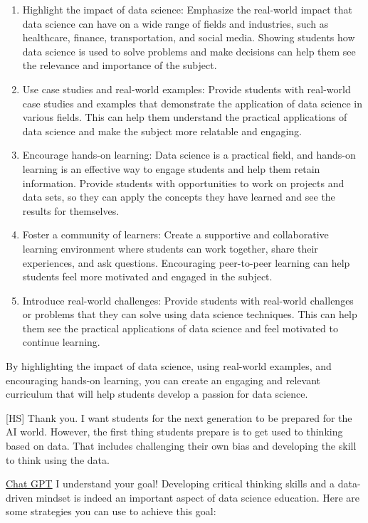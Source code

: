 \documentclass[
]{book}
\providecommand{\tightlist}{%
  \setlength{\itemsep}{0pt}\setlength{\parskip}{0pt}}
\theoremstyle{definition}
\theoremstyle{definition}
\theoremstyle{definition}
\theoremstyle{definition}
\theoremstyle{remark}
\begin{document}
\begin{enumerate}
\def\labelenumi{\arabic{enumi}.}
\tightlist
\item
  Highlight the impact of data science: Emphasize the real-world impact that data science can have on a wide range of fields and industries, such as healthcare, finance, transportation, and social media. Showing students how data science is used to solve problems and make decisions can help them see the relevance and importance of the subject.
\item
  Use case studies and real-world examples: Provide students with real-world case studies and examples that demonstrate the application of data science in various fields. This can help them understand the practical applications of data science and make the subject more relatable and engaging.
\item
  Encourage hands-on learning: Data science is a practical field, and hands-on learning is an effective way to engage students and help them retain information. Provide students with opportunities to work on projects and data sets, so they can apply the concepts they have learned and see the results for themselves.
\item
  Foster a community of learners: Create a supportive and collaborative learning environment where students can work together, share their experiences, and ask questions. Encouraging peer-to-peer learning can help students feel more motivated and engaged in the subject.
\item
  Introduce real-world challenges: Provide students with real-world challenges or problems that they can solve using data science techniques. This can help them see the practical applications of data science and feel motivated to continue learning.
\end{enumerate}

By highlighting the impact of data science, using real-world examples, and encouraging hands-on learning, you can create an engaging and relevant curriculum that will help students develop a passion for data science.

{[}HS{]} Thank you. I want students for the next generation to be prepared for the AI world. However, the first thing students prepare is to get used to thinking based on data. That includes challenging their own bias and developing the skill to think using the data.

\protect\hyperlink{chatgpt}{Chat GPT} I understand your goal! Developing critical thinking skills and a data-driven mindset is indeed an important aspect of data science education. Here are some strategies you can use to achieve this goal:
\end{document}
